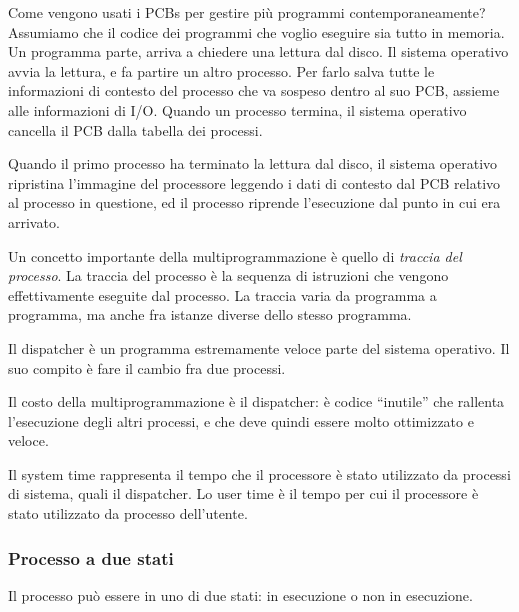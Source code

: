 Come vengono usati i PCBs per gestire pi\`u programmi contemporaneamente? Assumiamo che il codice dei programmi che voglio eseguire sia tutto in memoria. Un programma parte, arriva a chiedere una lettura dal disco. Il sistema operativo avvia la lettura, e fa partire un altro processo. Per farlo salva tutte le informazioni di contesto del processo che va sospeso dentro al suo PCB, assieme alle informazioni di I/O. Quando un processo termina, il sistema operativo cancella il PCB dalla tabella dei processi.

Quando il primo processo ha terminato la lettura dal disco, il sistema operativo ripristina l'immagine del processore leggendo i dati di contesto dal PCB relativo al processo in questione, ed il processo riprende l'esecuzione dal punto in cui era arrivato.

Un concetto importante della multiprogrammazione \`e quello di \textit{traccia del processo}. La traccia del processo \`e la sequenza di istruzioni che vengono effettivamente eseguite dal processo. La traccia varia da programma a programma, ma anche fra istanze diverse dello stesso programma.

Il dispatcher \`e un programma estremamente veloce parte del sistema operativo. Il suo compito \`e fare il cambio fra due processi.

Il costo della multiprogrammazione \`e il dispatcher: \`e codice ``inutile'' che rallenta l'esecuzione degli altri processi, e che deve quindi essere molto ottimizzato e veloce.

Il system time rappresenta il tempo che il processore \`e stato utilizzato da processi di sistema, quali il dispatcher. Lo user time \`e il tempo per cui il processore \`e stato utilizzato da processo dell'utente.

\subsubsection{Processo a due stati}

Il processo pu\`o essere in uno di due stati: in esecuzione o non in esecuzione.

\begin{center}
\end{center}

